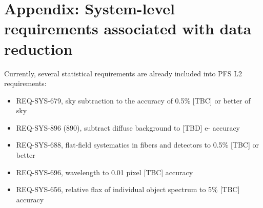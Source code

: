 \documentclass[a4paper,notitlepage]{article}
\begin{document}
\section*{Appendix: System-level requirements associated with data reduction}

Currently, several statistical requirements are already included into
PFS L2 requirements:
\begin{itemize}
  \item REQ-SYS-679, sky subtraction to the accuracy of 0.5\% [TBC] or better 
    of sky
  \item REQ-SYS-896 (890), subtract diffuse background to [TBD] e- accuracy
  \item REQ-SYS-688, flat-field systematics in fibers and detectors to 0.5\% 
    [TBC] or better
  \item REQ-SYS-696, wavelength to 0.01 pixel [TBC] accuracy
  \item REQ-SYS-656, relative flax of individual object spectrum to 5\% [TBC]
    accuracy
\end{itemize}
\end{document}
